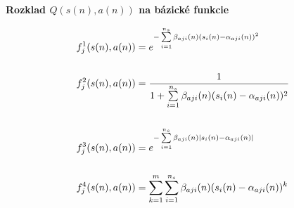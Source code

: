 \documentclass[xcolor=dvipsnames]{beamer}
\begin{document}
\begin{frame}{\bf Rozklad $Q(s(n), a(n))$ na bázické funkcie}


\begin{align*}
    f_j^1(\boldmath{s(n), a(n)}) &= e^{ -\sum\limits_{i=1}^{n_s}{\beta_{aji}(n)(s_i(n) - \alpha_{aji}(n))^2} } \nonumber \\
    \\
    f_j^2(\boldmath{s(n), a(n)}) &= \frac{1}{1 + \sum\limits_{i=1}^{n_s}{\beta_{aji}(n)(s_i(n) - \alpha_{aji}(n))^2}} \nonumber \\
    \\
    f_j^3(\boldmath{s(n), a(n)}) &= e^{ -\sum\limits_{i=1}^{n_s}{\beta_{aji}(n)\mid s_i(n) - \alpha_{aji}(n) \mid} } \nonumber  \\
    \\
    f_j^4(\boldmath{s(n), a(n)}) &= \sum\limits_{k=1}^{m} \sum\limits_{i=1}^{n_s}{ \beta_{aji}(n)(s_i(n) - \alpha_{aji}(n))^k } \nonumber
\end{align*}

\end{frame}
\end{document}
